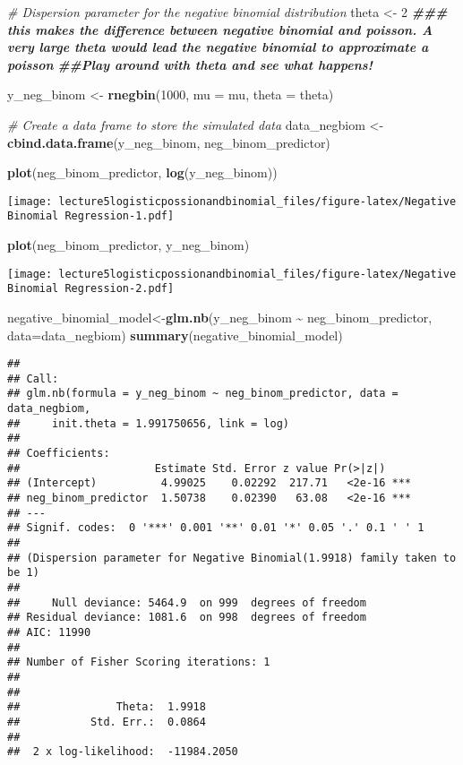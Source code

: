 \documentclass[
]{article}
\newenvironment{Shaded}{\begin{snugshade}}{\end{snugshade}}
\newcommand{\AttributeTok}[1]{\textcolor[rgb]{0.13,0.29,0.53}{#1}}
\newcommand{\CommentTok}[1]{\textcolor[rgb]{0.56,0.35,0.01}{\textit{#1}}}
\newcommand{\DecValTok}[1]{\textcolor[rgb]{0.00,0.00,0.81}{#1}}
\newcommand{\DocumentationTok}[1]{\textcolor[rgb]{0.56,0.35,0.01}{\textbf{\textit{#1}}}}
\newcommand{\FunctionTok}[1]{\textcolor[rgb]{0.13,0.29,0.53}{\textbf{#1}}}
\newcommand{\NormalTok}[1]{#1}
\newcommand{\OtherTok}[1]{\textcolor[rgb]{0.56,0.35,0.01}{#1}}
\newcommand{\SpecialCharTok}[1]{\textcolor[rgb]{0.81,0.36,0.00}{\textbf{#1}}}
\begin{document}
\begin{Shaded}
\begin{Highlighting}[]
\CommentTok{\# Dispersion parameter for the negative binomial distribution}
\NormalTok{theta }\OtherTok{\textless{}{-}} \DecValTok{2} \DocumentationTok{\#\#\# this makes the difference between negative binomial and poisson. A very large theta would lead the negative binomial to approximate a poisson}
\DocumentationTok{\#\#Play around with theta and see what happens!}


\NormalTok{y\_neg\_binom }\OtherTok{\textless{}{-}} \FunctionTok{rnegbin}\NormalTok{(}\DecValTok{1000}\NormalTok{, }\AttributeTok{mu =}\NormalTok{ mu, }\AttributeTok{theta =}\NormalTok{ theta)}

\CommentTok{\# Create a data frame to store the simulated data}
\NormalTok{data\_negbiom }\OtherTok{\textless{}{-}} \FunctionTok{cbind.data.frame}\NormalTok{(y\_neg\_binom, neg\_binom\_predictor)}

\FunctionTok{plot}\NormalTok{(neg\_binom\_predictor, }\FunctionTok{log}\NormalTok{(y\_neg\_binom))}
\end{Highlighting}
\end{Shaded}

\texttt{[image: lecture5logisticpossionandbinomial\_files/figure-latex/Negative Binomial Regression-1.pdf]}

\begin{Shaded}
\begin{Highlighting}[]
\FunctionTok{plot}\NormalTok{(neg\_binom\_predictor, y\_neg\_binom)}
\end{Highlighting}
\end{Shaded}

\texttt{[image: lecture5logisticpossionandbinomial\_files/figure-latex/Negative Binomial Regression-2.pdf]}

\begin{Shaded}
\begin{Highlighting}[]
\NormalTok{negative\_binomial\_model}\OtherTok{\textless{}{-}}\FunctionTok{glm.nb}\NormalTok{(y\_neg\_binom }\SpecialCharTok{\textasciitilde{}}\NormalTok{ neg\_binom\_predictor, }\AttributeTok{data=}\NormalTok{data\_negbiom)}
\FunctionTok{summary}\NormalTok{(negative\_binomial\_model)}
\end{Highlighting}
\end{Shaded}

\begin{verbatim}
## 
## Call:
## glm.nb(formula = y_neg_binom ~ neg_binom_predictor, data = data_negbiom, 
##     init.theta = 1.991750656, link = log)
## 
## Coefficients:
##                     Estimate Std. Error z value Pr(>|z|)    
## (Intercept)          4.99025    0.02292  217.71   <2e-16 ***
## neg_binom_predictor  1.50738    0.02390   63.08   <2e-16 ***
## ---
## Signif. codes:  0 '***' 0.001 '**' 0.01 '*' 0.05 '.' 0.1 ' ' 1
## 
## (Dispersion parameter for Negative Binomial(1.9918) family taken to be 1)
## 
##     Null deviance: 5464.9  on 999  degrees of freedom
## Residual deviance: 1081.6  on 998  degrees of freedom
## AIC: 11990
## 
## Number of Fisher Scoring iterations: 1
## 
## 
##               Theta:  1.9918 
##           Std. Err.:  0.0864 
## 
##  2 x log-likelihood:  -11984.2050
\end{verbatim}
\end{document}
